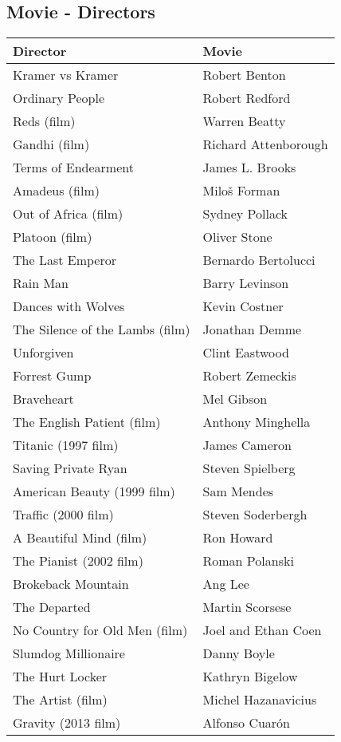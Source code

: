 \documentclass[10pt,11pt,12pt,oneside]{book}
\begin{document}
\begin{appendices}
\subsection{Movie - Directors}
\begin{table}[H]
	\begin{center}
		\begin{tabular}{|p{3in}|p{3in}|} \hline 
			Director & Movie \\ \hline 
			Kramer vs Kramer & Robert Benton \\ \hline 
			Ordinary People & Robert Redford \\ \hline 
			Reds (film) & Warren Beatty \\ \hline 
			Gandhi (film) & Richard Attenborough \\ \hline 
			Terms of Endearment & James L. Brooks \\ \hline 
			Amadeus (film) & Milo\v{s} Forman \\ \hline 
			Out of Africa (film) & Sydney Pollack \\ \hline 
			Platoon (film) & Oliver Stone \\ \hline 
			The Last Emperor & Bernardo Bertolucci \\ \hline 
			Rain Man & Barry Levinson \\ \hline 
			Dances with Wolves & Kevin Costner \\ \hline 
			The Silence of the Lambs (film) & Jonathan Demme \\ \hline 
			Unforgiven & Clint Eastwood \\ \hline 
			Forrest Gump & Robert Zemeckis \\ \hline 
			Braveheart & Mel Gibson \\ \hline 
			The English Patient (film) & Anthony Minghella \\ \hline 
			Titanic (1997 film) & James Cameron \\ \hline 
			Saving Private Ryan & Steven Spielberg \\ \hline 
			American Beauty (1999 film) & Sam Mendes \\ \hline 
			Traffic (2000 film) & Steven Soderbergh \\ \hline 
			A Beautiful Mind (film) & Ron Howard \\ \hline 
			The Pianist (2002 film) & Roman Polanski \\ \hline 
			Brokeback Mountain & Ang Lee \\ \hline 
			The Departed & Martin Scorsese \\ \hline 
			No Country for Old Men (film) & Joel and Ethan Coen \\ \hline 
			Slumdog Millionaire & Danny Boyle \\ \hline 
			The Hurt Locker & Kathryn Bigelow \\ \hline 
			The Artist (film) & Michel Hazanavicius \\ \hline 
			Gravity (2013 film) & Alfonso Cuar\'{o}n \\ \hline 
		\end{tabular}
	\end{center}
\end{table}


\end{appendices}
\end{document}
